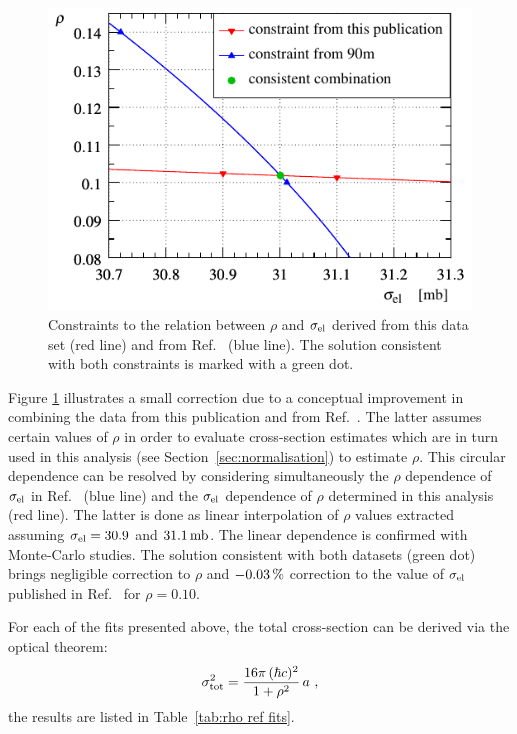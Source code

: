 \begin{figure}
\vskip-5mm
\begin{center}
\includegraphics{fig/si_el_rho_solution.pdf}
\vskip-3mm
\caption{%
Constraints to the relation between $\rho$ and $\sigma_{\rm el}$ derived from this data set (red line) and from Ref.~\cite{totem-13tev-90m} (blue line). The solution consistent with both constraints is marked with a green dot.
}
\label{fig:si_el rho sol}
\end{center}
\vskip-2mm
\end{figure}

Figure \ref{fig:si_el rho sol} illustrates a small correction due to a conceptual improvement in combining the data from this publication and from Ref.~\cite{totem-13tev-90m}. The latter assumes certain values of $\rho$ in order to evaluate cross-section estimates which are in turn used in this analysis (see Section~\ref{sec:normalisation}) to estimate $\rho$. This circular dependence can be resolved by considering simultaneously the $\rho$ dependence of $\sigma_{\rm el}$ in Ref.~\cite{totem-13tev-90m} (blue line) and the $\sigma_{\rm el}$ dependence of $\rho$ determined in this analysis (red line). The latter is done as linear interpolation of $\rho$ values extracted assuming $\sigma_{\rm el} = 30.9$ and $31.1\,{\rm mb}$. The linear dependence is confirmed with Monte-Carlo studies. The solution consistent with both datasets (green dot) brings negligible correction to $\rho$ and $-0.03\,{\rm \%}$ correction to the value of $\sigma_{\rm el}$ published in Ref.~\cite{totem-13tev-90m} for $\rho=0.10$.


For each of the fits presented above, the total cross-section can be derived via the optical theorem:
\begin{equation}
\label{eq:si tot}
\sigma_{\rm tot}^2 = {16\pi\, (\hbar c)^2\over 1 + \rho^2}\, a\ ,
\end{equation}
the results are listed in Table~\ref{tab:rho ref fits}.



